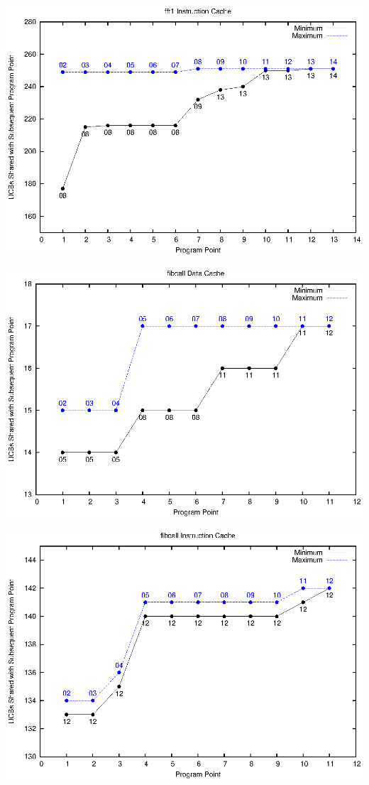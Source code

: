 \begin{center}
  \includegraphics[width=\linewidth]{eps/fft1-icache.eps}
\end{center}
\begin{center}
  \includegraphics[width=\linewidth]{eps/fibcall-dcache.eps}
\end{center}
\begin{center}
  \includegraphics[width=\linewidth]{eps/fibcall-icache.eps}
\end{center}
